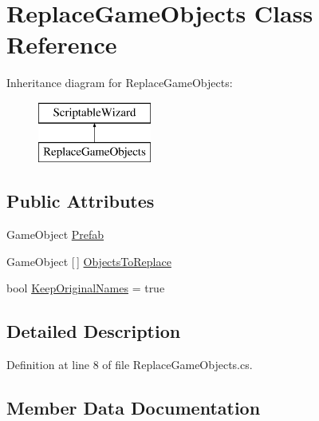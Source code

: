 \hypertarget{class_replace_game_objects}{}\section{Replace\+Game\+Objects Class Reference}
\label{class_replace_game_objects}
Inheritance diagram for Replace\+Game\+Objects\+:\begin{figure}[H]
\begin{center}
\leavevmode
\includegraphics[height=2.000000cm]{class_replace_game_objects}
\end{center}
\end{figure}
\subsection*{Public Attributes}
\begin{DoxyCompactItemize}
\item 
Game\+Object \mbox{\hyperlink{class_replace_game_objects_adcc6aa39ef9bdc7bc86754337b308f41}{Prefab}}
\item 
Game\+Object \mbox{[}$\,$\mbox{]} \mbox{\hyperlink{class_replace_game_objects_a6a8b17b8c4a7e533fe9c1b1f818853d6}{Objects\+To\+Replace}}
\item 
bool \mbox{\hyperlink{class_replace_game_objects_a995f64697b9a85d7223a4307018a52d2}{Keep\+Original\+Names}} = true
\end{DoxyCompactItemize}


\subsection{Detailed Description}


Definition at line 8 of file Replace\+Game\+Objects.\+cs.



\subsection{Member Data Documentation}
\mbox{\label{class_replace_game_objects_a995f64697b9a85d7223a4307018a52d2}} 
